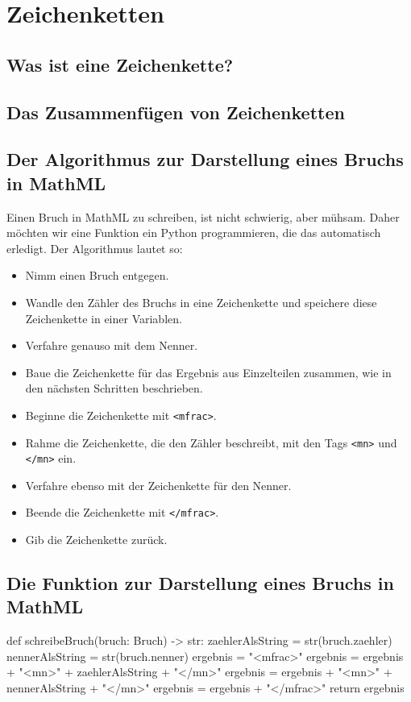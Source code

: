\section{Zeichenketten}

\subsection{Was ist eine Zeichenkette?}

\subsection{Das Zusammenfügen von Zeichenketten}

\subsection{Der Algorithmus zur Darstellung eines Bruchs in MathML}

Einen Bruch in MathML zu schreiben, ist nicht schwierig, aber mühsam. Daher möchten wir eine Funktion ein Python programmieren, die das automatisch erledigt. Der Algorithmus lautet so:
\begin{itemize}
	\item Nimm einen Bruch entgegen.
	\item Wandle den Zähler des Bruchs in eine Zeichenkette und speichere diese Zeichenkette in einer Variablen.
	\item Verfahre genauso mit dem Nenner.
	\item Baue die Zeichenkette für das Ergebnis aus Einzelteilen zusammen, wie in den nächsten Schritten beschrieben.
	\item Beginne die Zeichenkette mit \texttt{<mfrac>}.
	\item Rahme die Zeichenkette, die den Zähler beschreibt, mit den Tags \texttt{<mn>} und \texttt{</mn>} ein.
	\item Verfahre ebenso mit der Zeichenkette für den Nenner.
	\item Beende die Zeichenkette mit \texttt{</mfrac>}.
	\item Gib die Zeichenkette zurück.
\end{itemize}

\subsection{Die Funktion zur Darstellung eines Bruchs in MathML}

\begin{codePython}
def schreibeBruch(bruch: Bruch) -> str:	
	zaehlerAlsString = str(bruch.zaehler)
	nennerAlsString = str(bruch.nenner)
	ergebnis = "<mfrac>"
	ergebnis = ergebnis + "<mn>" + zaehlerAlsString + "</mn>"
	ergebnis = ergebnis + "<mn>" + nennerAlsString + "</mn>"
	ergebnis = ergebnis + "</mfrac>"
	return ergebnis
\end{codePython}